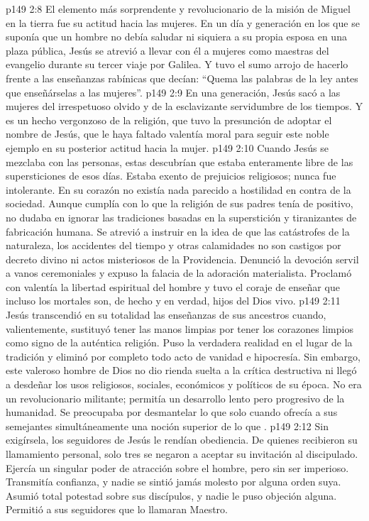 \vs p149 2:8 \pc El elemento más sorprendente y revolucionario de la misión de Miguel en la tierra fue su actitud hacia las mujeres. En un día y generación en los que se suponía que un hombre no debía saludar ni siquiera a su propia esposa en una plaza pública, Jesús se atrevió a llevar con él a mujeres como maestras del evangelio durante su tercer viaje por Galilea. Y tuvo el sumo arrojo de hacerlo frente a las enseñanzas rabínicas que decían: “Quema las palabras de la ley antes que enseñárselas a las mujeres”.
\vs p149 2:9 En una generación, Jesús sacó a las mujeres del irrespetuoso olvido y de la esclavizante servidumbre de los tiempos. Y es un hecho vergonzoso de la religión, que tuvo la presunción de adoptar el nombre de Jesús, que le haya faltado valentía moral para seguir este noble ejemplo en su posterior actitud hacia la mujer.
\vs p149 2:10 \pc Cuando Jesús se mezclaba con las personas, estas descubrían que estaba enteramente libre de las supersticiones de esos días. Estaba exento de prejuicios religiosos; nunca fue intolerante. En su corazón no existía nada parecido a hostilidad en contra de la sociedad. Aunque cumplía con lo que la religión de sus padres tenía de positivo, no dudaba en ignorar las tradiciones basadas en la superstición y tiranizantes de fabricación humana. Se atrevió a instruir en la idea de que las catástrofes de la naturaleza, los accidentes del tiempo y otras calamidades no son castigos por decreto divino ni actos misteriosos de la Providencia. Denunció la devoción servil a vanos ceremoniales y expuso la falacia de la adoración materialista. Proclamó con valentía la libertad espiritual del hombre y tuvo el coraje de enseñar que incluso los mortales son, de hecho y en verdad, hijos del Dios vivo.
\vs p149 2:11 Jesús transcendió en su totalidad las enseñanzas de sus ancestros cuando, valientemente, sustituyó tener las manos limpias por tener los corazones limpios como signo de la auténtica religión. Puso la verdadera realidad en el lugar de la tradición y eliminó por completo todo acto de vanidad e hipocresía. Sin embargo, este valeroso hombre de Dios no dio rienda suelta a la crítica destructiva ni llegó a desdeñar los usos religiosos, sociales, económicos y políticos de su época. No era un revolucionario militante; permitía un desarrollo lento pero progresivo de la humanidad. Se preocupaba por desmantelar lo que  solo cuando ofrecía a sus semejantes simultáneamente una noción superior de lo que .
\vs p149 2:12 \pc Sin exigírsela, los seguidores de Jesús le rendían obediencia. De quienes recibieron su llamamiento personal, solo tres se negaron a aceptar su invitación al discipulado. Ejercía un singular poder de atracción sobre el hombre, pero sin ser imperioso. Transmitía confianza, y nadie se sintió jamás molesto por alguna orden suya. Asumió total potestad sobre sus discípulos, y nadie le puso objeción alguna. Permitió a sus seguidores que lo llamaran Maestro.
